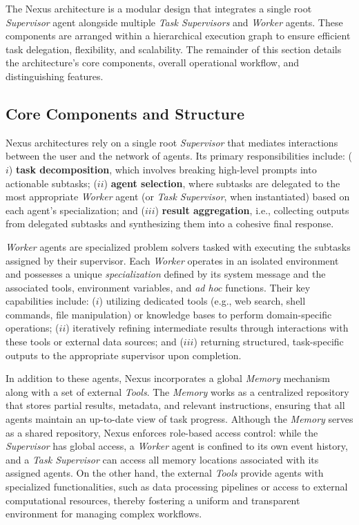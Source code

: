 The Nexus architecture is a modular design that integrates a single root {\em Supervisor} agent alongside multiple {\em Task Supervisors} and {\em Worker} agents. These components are arranged within a hierarchical execution graph to ensure efficient task delegation, flexibility, and scalability. The remainder of this section details the architecture's core components, overall operational workflow, and distinguishing features.

\subsection{Core Components and Structure}
Nexus architectures rely on a single root {\em Supervisor} that mediates interactions between the user and the network of agents. Its primary responsibilities include: ($i$) {\bf task decomposition}, which involves breaking high-level prompts into actionable subtasks; ($ii$) {\bf agent selection}, where subtasks are delegated to the most appropriate {\em Worker} agent (or {\em Task Supervisor}, when instantiated) based on each agent's specialization; and ($iii$) {\bf result aggregation}, i.e., collecting outputs from delegated subtasks and synthesizing them into a cohesive final response.

{\em Worker} agents are specialized problem solvers tasked with executing the subtasks assigned by their supervisor. Each {\em Worker} operates in an isolated environment and possesses a unique {\em specialization} defined by its system message and the associated tools, environment variables, and {\em ad hoc} functions. Their key capabilities include: ($i$) utilizing dedicated tools (e.g., web search, shell commands, file manipulation) or knowledge bases to perform domain-specific operations; ($ii$) iteratively refining intermediate results through interactions with these tools or external data sources; and ($iii$) returning structured, task-specific outputs to the appropriate supervisor upon completion.

In addition to these agents, Nexus incorporates a global {\em Memory} mechanism along with a set of external {\em Tools}. The {\em Memory} works as a centralized repository that stores partial results, metadata, and relevant instructions, ensuring that all agents maintain an up-to-date view of task progress. Although the {\em Memory} serves as a shared repository, Nexus enforces role-based access control: while the {\em Supervisor} has global access, a {\em Worker} agent is confined to its own event history, and a {\em Task Supervisor} can access all memory locations associated with its assigned agents. On the other hand, the external {\em Tools} provide agents with specialized functionalities, such as data processing pipelines or access to external computational resources, thereby fostering a uniform and transparent environment for managing complex workflows.

